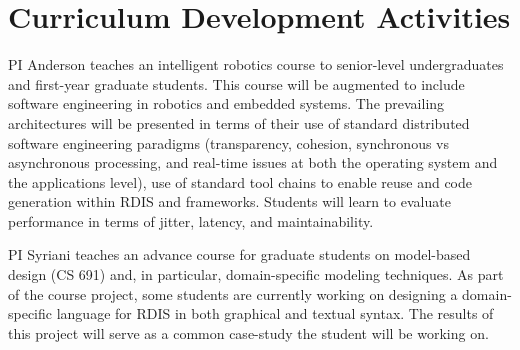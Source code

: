 
\section{Curriculum Development Activities}\label{sec:curriculum}


PI Anderson teaches an intelligent robotics course to senior-level undergraduates and first-year graduate students.  This course will be augmented to include software engineering in robotics and embedded systems.  The prevailing architectures will be presented in terms of their use of standard distributed software engineering paradigms (transparency, cohesion, synchronous vs asynchronous processing, and real-time issues at both the operating system and the applications level), use of standard tool chains to enable reuse and code generation within RDIS and frameworks.  Students will learn to evaluate performance in terms of jitter, latency, and maintainability.

PI Syriani teaches an advance course for graduate students on model-based design (CS 691) and, in particular, domain-specific modeling techniques.
As part of the course project, some students are currently working on designing a domain-specific language for RDIS in both graphical and textual syntax.
The results of this project will serve as a common case-study the student will be working on.